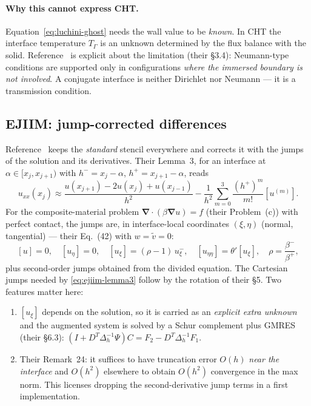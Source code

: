 \documentclass[11pt,a4paper]{article}
\newcommand{\jump}[1]{\left[#1\right]}
\newcommand{\grad}{\boldsymbol{\nabla}}
\begin{document}
\paragraph{Why this cannot express CHT.}
Equation~\eqref{eq:luchini-ghost} needs the wall value to be \emph{known}. In
CHT the interface temperature $T_\Gamma$ is an unknown determined by the flux
balance with the solid. Reference~\cite{luchini2025} is explicit about the
limitation (their \S3.4): Neumann-type conditions are supported only in
configurations \emph{where the immersed boundary is not involved}. A conjugate
interface is neither Dirichlet nor Neumann --- it is a transmission condition.

\subsection{EJIIM: jump-corrected differences}
\label{sec:ejiim}

Reference~\cite{ejiim2000} keeps the \emph{standard} stencil everywhere and
corrects it with the jumps of the solution and its derivatives. Their Lemma~3,
for an interface at $\alpha\in[x_j,x_{j+1})$ with $h^-=x_j-\alpha$,
$h^+=x_{j+1}-\alpha$, reads
\begin{equation}
  u_{xx}(x_j) \approx \frac{u(x_{j+1})-2u(x_j)+u(x_{j-1})}{h^2}
    - \frac{1}{h^{2}}\sum_{m=0}^{3}\frac{(h^{+})^{m}}{m!}\jump{u^{(m)}} .
  \label{eq:ejiim-lemma3}
\end{equation}
For the composite-material problem $\grad\!\cdot(\beta\grad u)=f$ (their
Problem~(c)) with perfect contact, the jumps are, in interface-local
coordinates $(\xi,\eta)$ (normal, tangential) --- their Eq.~(42) with
$w=\tilde v=0$:
\begin{equation}
  \jump{u}=0,\quad
  \jump{u_\eta}=0,\quad
  \jump{u_\xi}=(\rho-1)\,u^-_\xi,\quad
  \jump{u_{\eta\eta}}=\theta'\jump{u_\xi},\quad
  \rho=\frac{\beta^-}{\beta^+},
  \label{eq:ejiim-jumps}
\end{equation}
plus second-order jumps obtained from the divided equation. The Cartesian jumps
needed by \eqref{eq:ejiim-lemma3} follow by the rotation of their \S5. Two
features matter here:
\begin{enumerate}
\item $\jump{u_\xi}$ depends on the solution, so it is carried as an
      \emph{explicit extra unknown} and the augmented system is solved by a
      Schur complement plus GMRES (their \S6.3):
      $\left(I+D^{T}\Delta_h^{-1}\Psi\right)C = F_2-D^{T}\Delta_h^{-1}F_1$.
\item Their Remark~24: it suffices to have truncation error $O(h)$ \emph{near
      the interface} and $O(h^2)$ elsewhere to obtain $O(h^2)$ convergence in
      the max norm. This licenses dropping the second-derivative jump terms in
      a first implementation.
\end{enumerate}
\end{document}
